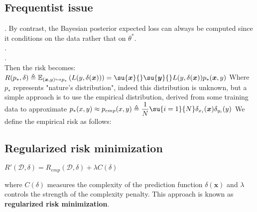 \subsection{Frequentist issue}
. By contrast, the Bayesian posterior expected loss can always be computed 
since it conditions on the data rather that on $\theta^{*}$.\\
.\\
.\\
Then the risk becomes:
$R(p_{*}, \delta) \triangleq \mathbb{E}_{(\bm{x}, y)\hookrightarrow p_{*}}\left(L(y,
\delta(\bm{x}))\right) = \su{\bm{x}}{}\su{\bm{y}}{}L(y, \delta(\bm{x}))p_{*}(\bm{x}, y)$
Where $p_{*}$ represents "nature's distribution", indeed this distribution is unknown, 
but a simple approach is to use the empirical distribution, derived from some training 
data to approximate $p_{*}(x,y)\approx
p_{emp}(x,y) \triangleq \dfrac{1}{N}\su{i=1}{N}\delta_{x_{i}}(\bm{x})\delta_{y_{i}}(y)$
We define the empirical risk as follows:


\subsection{Regularized risk minimization}
\begin{center}
    $R'(\mathcal{D}, \delta) = R_{emp}(\mathcal{D}, \delta) + \lambda C(\delta)$
\end{center}
where $C(\delta)$ measures the complexity of the prediction function $\delta(\bm{x})$ and 
$\lambda$ controls the strength of the complexity penalty. 
This approach is known as \textbf{regularized risk minimization}.
